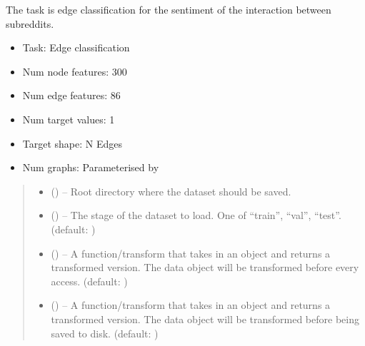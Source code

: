 \documentclass[letterpaper,10pt,english]{sphinxhowto}
\begin{document}
\begin{fulllineitems}
\sphinxAtStartPar
The task is edge classification for the sentiment of the interaction between subreddits.
\begin{itemize}
\item {} 
\sphinxAtStartPar
Task: Edge classification

\item {} 
\sphinxAtStartPar
Num node features: 300

\item {} 
\sphinxAtStartPar
Num edge features: 86

\item {} 
\sphinxAtStartPar
Num target values: 1

\item {} 
\sphinxAtStartPar
Target shape: N Edges

\item {} 
\sphinxAtStartPar
Num graphs: Parameterised by 

\end{itemize}
\begin{quote}\begin{description}
\begin{itemize}
\item {} 
\sphinxAtStartPar
{} () – Root directory where the dataset should be saved.

\item {} 
\sphinxAtStartPar
{} () – The stage of the dataset to load. One of “train”, “val”, “test”. (default: )

\item {} 
\sphinxAtStartPar
{} (\sphinxstyleliteralemphasis{\sphinxupquote{, }}) – A function/transform that takes in an  object and returns a transformed version. The data object will be transformed before every access. (default: )

\item {} 
\sphinxAtStartPar
{} (\sphinxstyleliteralemphasis{\sphinxupquote{, }}) – A function/transform that takes in an  object and returns a transformed version. The data object will be transformed before being saved to disk. (default: )


\end{itemize}
\end{description}
\end{quote}
\end{fulllineitems}
\end{document}
